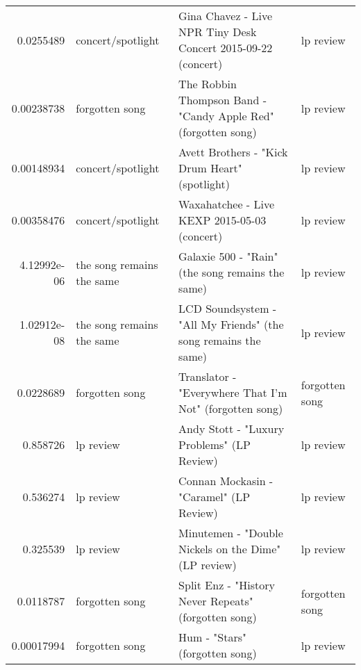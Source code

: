 \documentclass[letterpaper,10pt]{article}
\begin{document}
\begin{table}[H]
\begin{adjustbox}{max width=\linewidth}
\begin{tabular}{rlll}
  0.0255489   & concert/spotlight         & Gina Chavez - Live NPR Tiny Desk Concert 2015-09-22 (concert)                                                & lp review                 \\
  0.00238738  & forgotten song            & The Robbin Thompson Band - "Candy Apple Red" (forgotten song)                                                & lp review                 \\
  0.00148934  & concert/spotlight         & Avett Brothers - "Kick Drum Heart" (spotlight)                                                               & lp review                 \\
  0.00358476  & concert/spotlight         & Waxahatchee - Live KEXP 2015-05-03 (concert)                                                                 & lp review                 \\
  4.12992e-06 & the song remains the same & Galaxie 500 - "Rain" (the song remains the same)                                                             & lp review                 \\
  1.02912e-08 & the song remains the same & LCD Soundsystem - "All My Friends" (the song remains the same)                                               & lp review                 \\
  0.0228689   & forgotten song            & Translator - "Everywhere That I'm Not" (forgotten song)                                                      & forgotten song            \\
  0.858726    & lp review                 & Andy Stott - "Luxury Problems" (LP Review)                                                                   & lp review                 \\
  0.536274    & lp review                 & Connan Mockasin - "Caramel" (LP Review)                                                                      & lp review                 \\
  0.325539    & lp review                 & Minutemen - "Double Nickels on the Dime" (LP review)                                                         & lp review                 \\
  0.0118787   & forgotten song            & Split Enz - "History Never Repeats" (forgotten song)                                                         & forgotten song            \\
  0.00017994  & forgotten song            & Hum - "Stars" (forgotten song)                                                                               & lp review                 \\

\end{tabular}
\end{adjustbox}
\end{table}
\end{document}
